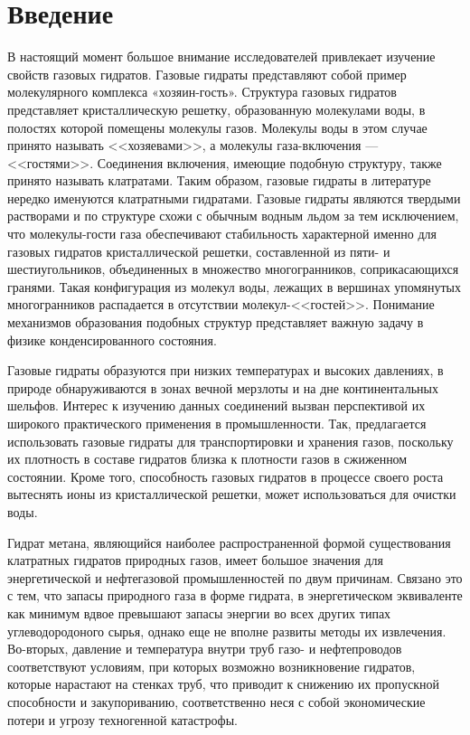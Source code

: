 \chapter*{Введение}
В настоящий момент большое внимание исследователей привлекает изучение свойств газовых гидратов. Газовые гидраты представляют собой пример молекулярного комплекса «хозяин-гость».  Структура газовых гидратов представляет кристаллическую решетку, образованную молекулами воды, в полостях которой помещены молекулы газов. Молекулы воды в этом случае принято называть <<хозяевами>>, а молекулы газа-включения --- <<гостями>>. Соединения включения, имеющие подобную структуру, также принято называть клатратами. Таким образом, газовые гидраты в литературе нередко именуются клатратными гидратами. Газовые гидраты являются твердыми растворами и по структуре схожи с обычным водным льдом за тем исключением, что молекулы-гости газа обеспечивают стабильность характерной именно для газовых гидратов кристаллической решетки, составленной из пяти- и шестиугольников, объединенных в множество многогранников, соприкасающихся гранями. Такая конфигурация из молекул воды, лежащих в вершинах упомянутых многогранников распадается в отсутствии молекул-<<гостей>>. Понимание механизмов образования подобных структур представляет важную задачу в физике конденсированного состояния. 

Газовые гидраты образуются при низких температурах и высоких давлениях, в природе обнаруживаются в зонах вечной мерзлоты и на дне континентальных шельфов. Интерес к изучению данных соединений вызван перспективой их широкого практического применения в промышленности. Так, предлагается использовать газовые гидраты для транспортировки и хранения газов, поскольку их плотность в составе гидратов близка к плотности газов в сжиженном состоянии. Кроме того, способность газовых гидратов в процессе своего роста вытеснять ионы из кристаллической решетки, может использоваться для очистки воды.

Гидрат метана, являющийся наиболее распространенной формой существования клатратных гидратов природных газов, имеет большое значения для энергетической и нефтегазовой промышленностей по двум причинам. Связано это с тем, что запасы природного газа в форме гидрата, в энергетическом эквиваленте как минимум вдвое превышают запасы энергии во всех других типах углеводородоного сырья, однако еще не вполне развиты методы их извлечения. Во-вторых, давление и температура внутри труб газо- и нефтепроводов соответствуют условиям, при которых возможно возникновение гидратов, которые нарастают на стенках труб, что приводит к снижению их пропускной способности и закупориванию, соответственно неся с собой экономические потери и угрозу техногенной катастрофы. 

